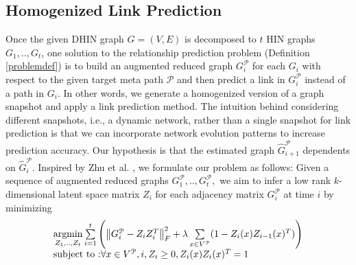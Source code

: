 
\subsection{Homogenized Link Prediction}\label{def:HLP}

Once the given DHIN graph $G=(V,E)$ is decomposed to $t$ HIN graphs $G_1, .., G_t$, one solution to the relationship prediction problem (Definition \ref{problemdef}) is to build an augmented reduced graph $G_i^\mathcal{P}$ for each $G_i$ with respect to the given target meta path $\mathcal{P}$ and then predict a link in $G_i^\mathcal{P}$ instead of a path in $G_i$. In other words, we generate a homogenized version of a graph snapshot and apply a link prediction method. The intuition behind considering different snapshots, i.e., a dynamic network, rather than a single snapshot for link prediction is that we can incorporate network evolution patterns to increase prediction accuracy. Our hypothesis is that the estimated graph $\hat{G}_{i+1}^\mathcal{P}$ dependents on $\hat{G}_i^\mathcal{P}$. Inspired by %
Zhu et al. \cite{Zhu2016}%
, we formulate our problem as follows: Given a sequence of augmented reduced graphs $G^\mathcal{P}_1, .., G^\mathcal{P}_t,$ we aim to infer a low rank $k$-dimensional latent space matrix $Z_i$ for each adjacency matrix $G^\mathcal{P}_i$ at time $i$ by minimizing 
\begin{equation}\label{latentOrigEqu}
    \begin{array}{l}
\operatorname*{argmin}\limits_{Z_1, .., Z_t}\sum\limits_{i=1}^{t}\left(\left \| G^\mathcal{P}_i-Z_{i}Z_{i}^T \right \|^2_F+\lambda \sum\limits_{x \in V^\mathcal{P}}(1-Z_{i}(x)Z_{i-1}(x)^T) \right)
\\
\text{subject to :} \forall x \in V^\mathcal{P},i,Z_{i}\geq 0, Z_{i}(x)Z_{i}(x)^T=1
    \end{array}
\end{equation}
